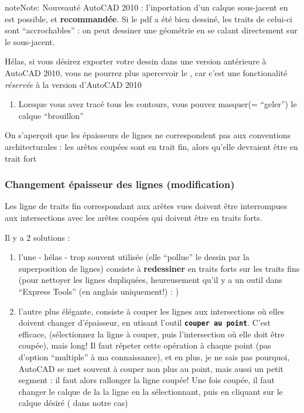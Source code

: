 \documentclass[a4paper,12pt,french]{sphinxmanual}
\begin{document}
\begin{notice}{note}{Note:}
Nouveauté AutoCAD 2010 : l'inportation d'un calque sous-jacent en  est possible, et \textbf{recommandée}. Si le pdf a été bien dessiné, les traits de celui-ci sont ``accrochables'' : on peut dessiner une géométrie en se calant directement sur le  sous-jacent.

Hélas, si vous désirez exporter votre dessin dans une version antérieure à AutoCAD 2010, vous ne pourrez plus apercevoir le , car c'est une fonctionalité \emph{réservée} à la version d'AutoCAD 2010
\end{notice}
\begin{enumerate}
\item {} 
Lorsque vous avez tracé tous les contours, vous pouvez masquer(= ``geler'') le calque ``brouillon''

\end{enumerate}

On s'aperçoit que les épaisseurs de lignes ne correspondent pas aux conventions architecturales : les arêtes coupées sont en trait fin, alors qu'elle devraient être en trait fort


\subsubsection{Changement épaisseur des lignes (modification)}
\label{init_su+acad/004_acad1:changement-epaisseur-des-lignes-modification}
Les ligne de traits fin correspondant aux arêtes vues doivent être interrompues aux intersections avec les arêtes coupées qui doivent être en traits forts.

Il y a 2 solutions :
\begin{enumerate}
\item {} 
l'une - hélas - trop souvent utilisée (elle ``pollue'' le dessin par la superposition de lignes) consiste à \textbf{redessiner} en traits forts sur les traits fins (pour nettoyer les lignes dupliquées, heureusement qu'il y a un outil dans ``Express Tools'' (en anglais uniquement!) : )

\item {} 
l'autre plus élégante, consiste à couper les lignes aux intersections où elles doivent changer d'épaisseur, en utisant l'outil \textbf{\texttt{couper au point}}. C'est efficace, (sélectionnez la ligne à couper, puis l'intersection où elle doit être coupée), mais long! Il faut répeter cette opération à chaque point (pas d'option ``multiple'' à ma connaissance), et en plus, je ne sais pas pourquoi, AutoCAD se met souvent à couper non plus au point, mais aussi un petit segment : il faut alors rallonger la ligne coupée! Une fois coupée, il faut changer le calque de la la ligne en la sélectionnant, puis en cliquant sur le calque désiré ( dans notre cas)

\end{enumerate}
\end{document}
